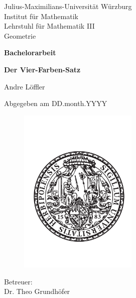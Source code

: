 \begin{titlepage}
  Julius-Maximilians-Universität Würzburg\\
  Institut für Mathematik\\
  Lehrstuhl für Mathematik III\\
  Geometrie
  
  \vspace{3cm}
  
  \begin{center}
   \LARGE\textbf{Bachelorarbeit}
  \end{center}
  
  \vspace{0cm}
  
  \begin{center}
   \huge\textbf{Der Vier-Farben-Satz}
  \end{center}
  
  \vspace{1cm}
  
  \begin{center}
   \Large Andre Löffler
  \end{center}
  
  \vspace{0cm}
  
  \begin{center}
   \Large Abgegeben am DD.month.YYYY
  \end{center}
  
  \begin{figure}[ht]
    \begin{center}
      \includegraphics[height=8cm]{siegel.pdf}  
    \end{center}
  \end{figure}
  
  \begin{center}
   \Large Betreuer:\\Dr. Theo Grundhöfer
  \end{center}
\end{titlepage}
